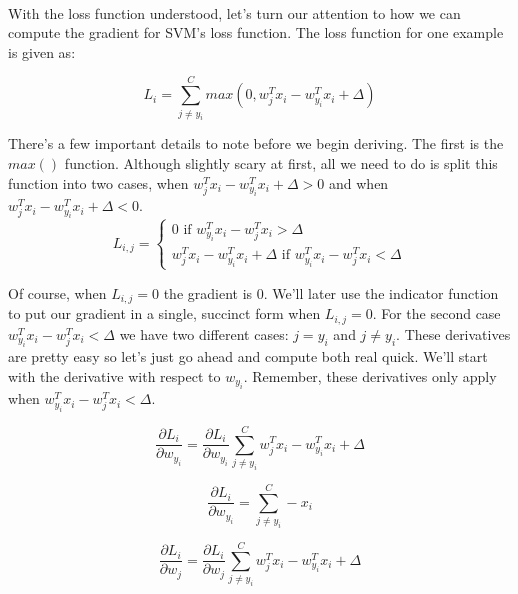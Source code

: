 \documentclass[12pt]{article}
\begin{document}
\paragraph{}
With the loss function understood, let's turn our attention to how we can compute 
the gradient for SVM's loss function. The loss function for one example is given as: 

\begin{equation}
    L_i = \sum_{j \neq y_i}^{C} max(0, w_j^T x_i - w_{y_i}^T x_i + \Delta)
\end{equation}

\noindent There's a few important details to note before we begin deriving. The 
first is the $max()$ function. Although slightly scary at first, all we need to 
do is split this function into two cases, when $w_j^T x_i - w_{y_i}^T x_i + \Delta > 0$
and when $w_j^T x_i - w_{y_i}^T x_i + \Delta < 0$. 
\begin{equation}
    L_{i, j} = 
    \begin{cases}
        0 \text{ if } w_{y_i}^T x_i - w_j^T x_i > \Delta\\
        w_j^T x_i - w_{y_i}^T x_i + \Delta \text{ if } w_{y_i}^T x_i - w_j^T x_i < \Delta
    \end{cases} 
\end{equation}

Of course, when $L_{i, j} = 0$ the gradient is 0. We'll later use the indicator function
to put our gradient in a single, succinct form when $L_{i, j} = 0$. For the second case 
$w_{y_i}^T x_i - w_j^T x_i < \Delta$ we have two different cases: $j = y_i$ and $j \neq y_i$. 
These derivatives are pretty easy so let's just go ahead and compute both real quick.
We'll start with the derivative with respect to $w_{y_i}$. Remember, these 
derivatives only apply when $w_{y_i}^T x_i - w_j^T x_i < \Delta$.

\begin{equation}
    \frac{\partial L_i}{\partial w_{y_i}} = \frac{\partial L_i}{\partial w_{y_i}}
    \sum_{j \neq y_i}^C w_j^T x_i - w_{y_i}^T x_i + \Delta
\end{equation}

\begin{equation}
    \frac{\partial L_i}{\partial w_{y_i}} = \sum_{j \neq y_i}^C -x_i
\end{equation}

\begin{equation}
    \frac{\partial L_i}{\partial w_j} = \frac{\partial L_i}{\partial w_j}
    \sum_{j \neq y_i}^C w_j^T x_i - w_{y_i}^T x_i + \Delta
\end{equation}
\end{document}
